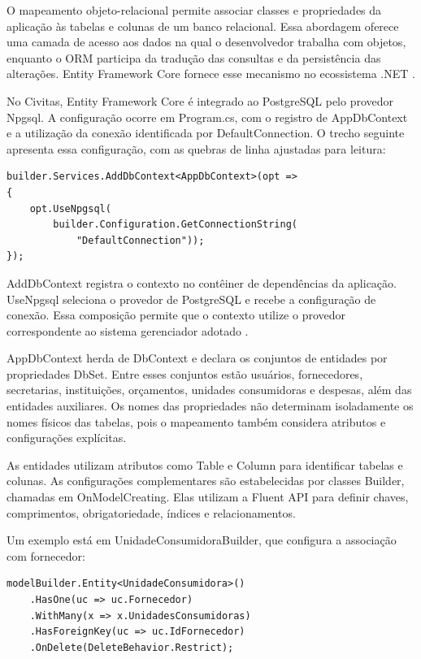 O mapeamento objeto-relacional permite associar classes e propriedades da aplicação às tabelas e colunas de um banco relacional. Essa abordagem oferece uma camada de acesso aos dados na qual o desenvolvedor trabalha com objetos, enquanto o ORM participa da tradução das consultas e da persistência das alterações. Entity Framework Core fornece esse mecanismo no ecossistema .NET \parencite{MicrosoftEFCore}.

No Civitas, Entity Framework Core é integrado ao PostgreSQL pelo provedor Npgsql. A configuração ocorre em Program.cs, com o registro de AppDbContext e a utilização da conexão identificada por DefaultConnection. O trecho seguinte apresenta essa configuração, com as quebras de linha ajustadas para leitura:

\begin{verbatim}
builder.Services.AddDbContext<AppDbContext>(opt =>
{
    opt.UseNpgsql(
        builder.Configuration.GetConnectionString(
            "DefaultConnection"));
});
\end{verbatim}

AddDbContext registra o contexto no contêiner de dependências da aplicação. UseNpgsql seleciona o provedor de PostgreSQL e recebe a configuração de conexão. Essa composição permite que o contexto utilize o provedor correspondente ao sistema gerenciador adotado \parencite{MicrosoftDbContext}.

AppDbContext herda de DbContext e declara os conjuntos de entidades por propriedades DbSet. Entre esses conjuntos estão usuários, fornecedores, secretarias, instituições, orçamentos, unidades consumidoras e despesas, além das entidades auxiliares. Os nomes das propriedades não determinam isoladamente os nomes físicos das tabelas, pois o mapeamento também considera atributos e configurações explícitas.

As entidades utilizam atributos como Table e Column para identificar tabelas e colunas. As configurações complementares são estabelecidas por classes Builder, chamadas em OnModelCreating. Elas utilizam a Fluent API para definir chaves, comprimentos, obrigatoriedade, índices e relacionamentos.

Um exemplo está em UnidadeConsumidoraBuilder, que configura a associação com fornecedor:

\begin{verbatim}
modelBuilder.Entity<UnidadeConsumidora>()
    .HasOne(uc => uc.Fornecedor)
    .WithMany(x => x.UnidadesConsumidoras)
    .HasForeignKey(uc => uc.IdFornecedor)
    .OnDelete(DeleteBehavior.Restrict);
\end{verbatim}

